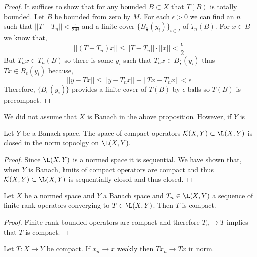 \documentclass[12pt]{article}
\renewcommand{\K}{\mathbb{K}}
\renewcommand{\K}{\mathcal{K}}
\begin{document}
\begin{proof}
It suffices to show that for any bounded $B \subset X$ that $T(B)$ is totally bounded. Let $B$ be bounded from zero by $M$. For each $\epsilon > 0$ we can find an $n$ such that $|| T -  T_n || < \frac{\epsilon}{2M}$ and a finite cover $\{ B_{\frac{\epsilon}{2}}(y_i) \}_{i \in I}$ of $T_n(B)$.  For $x \in B$ we know that,
\[ || (T - T_n) x || \le || T - T_n || \cdot || x || < \frac{\epsilon}{2} \]
But $T_n x \in T_n(B)$ so there is some $y_i$ such that $T_n x \in B_{\frac{\epsilon}{2}}(y_i)$ thus $T x \in B_\epsilon(y_i)$ because,
\[ || y - T x || \le || y - T_n x || + || T x - T_n x || < \epsilon \]
Therefore, $\{ B_\epsilon(y_i) \}$ provides a finite cover of $T(B)$ by $\epsilon$-balls so $T(B)$ is precompact.  
\end{proof}

\begin{rmk}
We did not assume that $X$ is Banach in the above proposition. However, if $Y$ is 
\end{rmk}

\begin{cor}
Let $Y$ be a Banach space. The space of compact operators $\K(X, Y) \subset \L(X, Y)$ is closed in the norm topoolgy on $\L(X, Y)$.
\end{cor}

\begin{proof}
Since $\L(X, Y)$ is a normed space it is sequential. We have shown that, when $Y$ is Banach, limits of compact operators are compact and thus $\K(X, Y) \subset \L(X, Y)$ is sequentially closed and thus closed.
\end{proof}

\begin{cor}
Let $X$ be a normed space and $Y$ a Banach space and $T_n \in \L(X, Y)$ a sequence of finite rank operators converging to $T \in \L(X, Y)$. Then $T$ is compact.
\end{cor}

\begin{proof}
Finite rank bounded operators are compact and therefore $T_n \to T$ implies that $T$ is compact.
\end{proof}

\begin{prop}
Let $T : X \to Y$ be compact. If $x_n \to x$ weakly then $T x_n \to T x$ in norm.
\end{prop}
\end{document}
